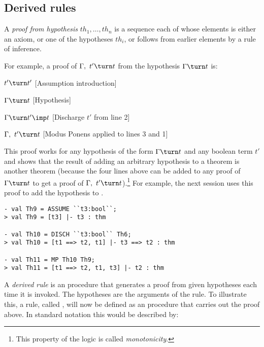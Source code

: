 \subsection{Derived rules}


A \emph{proof from hypothesis} $th_1, \ldots, th_n$ is a sequence each of whose elements is either an axiom, or one of the hypotheses $th_i$, or follows from earlier elements by a rule of inference.

For example, a proof of $\Gamma,\ t'\turn t$ from the hypothesis $\Gamma\turn t$ is:

\begin{proofenumerate}
\item $ t'\turn t'$ \hfill [Assumption introduction]
\item $ \Gamma\turn t$ \hfill [Hypothesis]
\item $ \Gamma\turn t'\imp t$ \hfill [Discharge $t'$ from line 2]
\item $ \Gamma,\ t'\turn t$ \hfill [Modus Ponens applied to lines 3 and 1]
\end{proofenumerate}

\noindent This proof works for any hypothesis of the form $\Gamma\turn t$
and any boolean term $t'$ and shows that the result of adding an
arbitrary hypothesis to a theorem is another theorem (because the four
lines above can be added to any proof of $\Gamma\turn t$ to get a
proof of $\Gamma,\ t'\turn t$).\footnote{This property of the logic is
  called {\it monotonicity}.} For example, the next session uses this
proof to add the hypothesis  to .

\begin{session}
\begin{verbatim}
- val Th9 = ASSUME ``t3:bool``;
> val Th9 = [t3] |- t3 : thm

- val Th10 = DISCH ``t3:bool`` Th6;
> val Th10 = [t1 ==> t2, t1] |- t3 ==> t2 : thm

- val Th11 = MP Th10 Th9;
> val Th11 = [t1 ==> t2, t1, t3] |- t2 : thm
\end{verbatim}
\end{session}


    A {\it derived rule\/} is an \ML{} procedure that generates a proof
    from given hypotheses each time it is invoked. The hypotheses are
    the arguments of the rule.  To illustrate this, a rule, called
    , will now be defined as an \ML{} procedure that
    carries out the proof above. In standard notation this would be
    described by:


